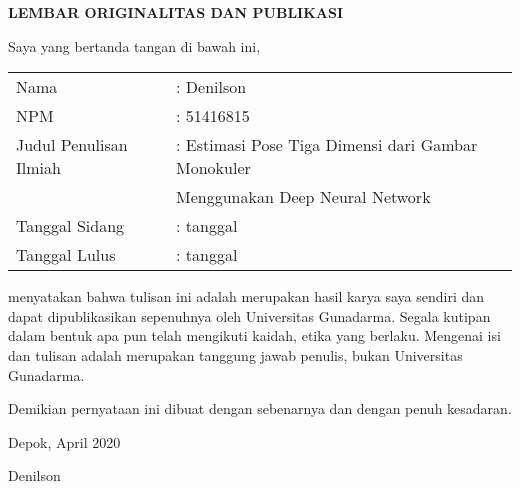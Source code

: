 
\newpage
{}
\begin{center}
    {\large \bf \centering LEMBAR ORIGINALITAS DAN PUBLIKASI}
    \vspace{0.75cm}
\end{center}

\noindent Saya yang bertanda tangan di bawah ini,
\vspace{0.5cm}

\begin{flushleft}
    \begin{tabular}{ll}
        Nama                   & : Denilson                                         \\
        NPM                    & : 51416815                                         \\
        Judul Penulisan Ilmiah & : Estimasi Pose Tiga Dimensi dari Gambar Monokuler \\
                               & \hspace{5pt} Menggunakan Deep Neural Network       \\
        Tanggal Sidang         & : tanggal                                          \\
        Tanggal Lulus          & : tanggal                                          \\
    \end{tabular}
\end{flushleft}

\vspace{0.5cm}

\noindent menyatakan bahwa tulisan ini adalah merupakan hasil karya saya sendiri dan dapat
dipublikasikan sepenuhnya oleh Universitas Gunadarma. Segala kutipan dalam bentuk apa pun telah
mengikuti kaidah, etika yang berlaku. Mengenai isi dan tulisan adalah merupakan tanggung jawab
penulis, bukan Universitas Gunadarma.

\vspace{0.5cm}

\noindent Demikian pernyataan ini dibuat dengan sebenarnya dan dengan penuh kesadaran.

\begin{flushright}
    Depok, April 2020

    \vspace{2cm}

    Denilson
\end{flushright}